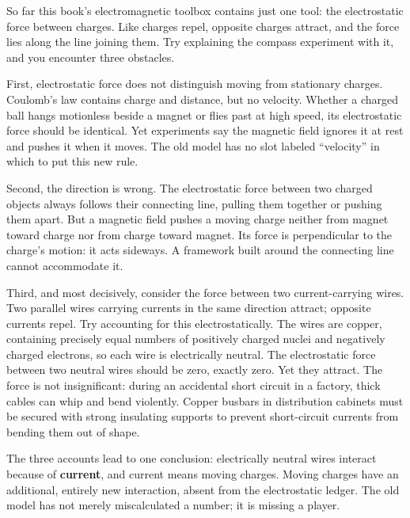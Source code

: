 
\begin{mainline}
So far this book's electromagnetic toolbox contains just one tool: the electrostatic force between charges. Like charges repel, opposite charges attract, and the force lies along the line joining them. Try explaining the compass experiment with it, and you encounter three obstacles.

First, electrostatic force does not distinguish moving from stationary charges. Coulomb's law contains charge and distance, but no velocity. Whether a charged ball hangs motionless beside a magnet or flies past at high speed, its electrostatic force should be identical. Yet experiments say the magnetic field ignores it at rest and pushes it when it moves. The old model has no slot labeled ``velocity'' in which to put this new rule.

Second, the direction is wrong. The electrostatic force between two charged objects always follows their connecting line, pulling them together or pushing them apart. But a magnetic field pushes a moving charge neither from magnet toward charge nor from charge toward magnet. Its force is perpendicular to the charge's motion: it acts sideways. A framework built around the connecting line cannot accommodate it.

Third, and most decisively, consider the force between two current-carrying wires. Two parallel wires carrying currents in the same direction attract; opposite currents repel. Try accounting for this electrostatically. The wires are copper, containing precisely equal numbers of positively charged nuclei and negatively charged electrons, so each wire is electrically neutral. The electrostatic force between two neutral wires should be zero, exactly zero. Yet they attract. The force is not insignificant: during an accidental short circuit in a factory, thick cables can whip and bend violently. Copper busbars in distribution cabinets must be secured with strong insulating supports to prevent short-circuit currents from bending them out of shape.

The three accounts lead to one conclusion: electrically neutral wires interact because of \textbf{current}, and current means moving charges. Moving charges have an additional, entirely new interaction, absent from the electrostatic ledger. The old model has not merely miscalculated a number; it is missing a player.
\end{mainline}

